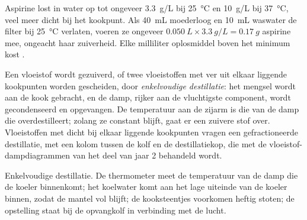\begin{example}
Aspirine lost in water op tot ongeveer \qty{3.3}{g/L} bij
\qty{25}{\celsius} en \qty{10}{g/L} bij \qty{37}{\celsius}, veel meer
dicht bij het kookpunt. Als \qty{40}{mL} moederloog en \qty{10}{mL}
waswater de filter bij \qty{25}{\celsius} verlaten, voeren ze ongeveer
$\qty{0.050}{L} \times \qty{3.3}{g/L} = \qty{0.17}{g}$ aspirine mee, ongeacht
haar zuiverheid. Elke milliliter oplosmiddel boven het minimum
kost .
\end{example}

Een vloeistof wordt gezuiverd, of twee vloeistoffen met ver uit elkaar
liggende kookpunten worden gescheiden, door \emph{enkelvoudige
destillatie}: het mengsel wordt aan de kook gebracht, en de damp, rijker
aan de vluchtigste component, wordt gecondenseerd en opgevangen. De
temperatuur aan de zijarm is die van de damp die overdestilleert; zolang
ze constant blijft, gaat er een zuivere stof over. Vloeistoffen met dicht
bij elkaar liggende kookpunten vragen een gefractioneerde destillatie,
met een kolom tussen de kolf en de destillatiekop, die met de
vloeistof-dampdiagrammen van het deel van jaar 2 behandeld wordt.

\begin{omfigure}

{\small Enkelvoudige destillatie. De thermometer meet de temperatuur van
de damp die de koeler binnenkomt; het koelwater komt aan het lage uiteinde
van de koeler binnen, zodat de mantel vol blijft; de kooksteentjes
voorkomen heftig stoten; de opstelling staat bij de opvangkolf in
verbinding met de lucht.}
\end{omfigure}

